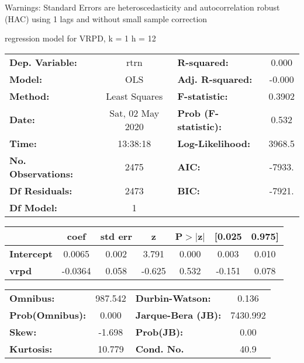 Warnings: \newline
 [1] Standard Errors are heteroscedasticity and autocorrelation robust (HAC) using 1 lags and without small sample correction\ 

regression model for VRPD, k = 1 h = 12\begin{center}
\begin{tabular}{lclc}
\toprule
\textbf{Dep. Variable:}    &       rtrn       & \textbf{  R-squared:         } &     0.000   \\
\textbf{Model:}            &       OLS        & \textbf{  Adj. R-squared:    } &    -0.000   \\
\textbf{Method:}           &  Least Squares   & \textbf{  F-statistic:       } &    0.3902   \\
\textbf{Date:}             & Sat, 02 May 2020 & \textbf{  Prob (F-statistic):} &    0.532    \\
\textbf{Time:}             &     13:38:18     & \textbf{  Log-Likelihood:    } &    3968.5   \\
\textbf{No. Observations:} &        2475      & \textbf{  AIC:               } &    -7933.   \\
\textbf{Df Residuals:}     &        2473      & \textbf{  BIC:               } &    -7921.   \\
\textbf{Df Model:}         &           1      & \textbf{                     } &             \\
\bottomrule
\end{tabular}
\begin{tabular}{lcccccc}
                   & \textbf{coef} & \textbf{std err} & \textbf{z} & \textbf{P$> |$z$|$} & \textbf{[0.025} & \textbf{0.975]}  \\
\midrule
\textbf{Intercept} &       0.0065  &        0.002     &     3.791  &         0.000        &        0.003    &        0.010     \\
\textbf{vrpd}      &      -0.0364  &        0.058     &    -0.625  &         0.532        &       -0.151    &        0.078     \\
\bottomrule
\end{tabular}
\begin{tabular}{lclc}
\textbf{Omnibus:}       & 987.542 & \textbf{  Durbin-Watson:     } &    0.136  \\
\textbf{Prob(Omnibus):} &   0.000 & \textbf{  Jarque-Bera (JB):  } & 7430.992  \\
\textbf{Skew:}          &  -1.698 & \textbf{  Prob(JB):          } &     0.00  \\
\textbf{Kurtosis:}      &  10.779 & \textbf{  Cond. No.          } &     40.9  \\
\bottomrule
\end{tabular}
\end{center}

